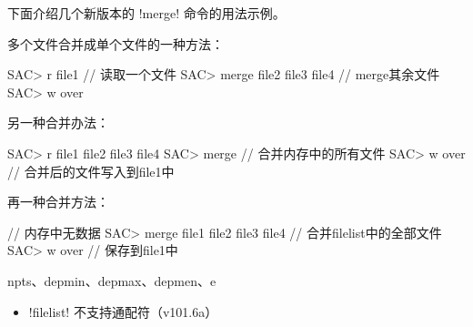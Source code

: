 下面介绍几个新版本的 !merge! 命令的用法示例。

多个文件合并成单个文件的一种方法：
\begin{SACCode}
SAC> r file1                        // 读取一个文件
SAC> merge file2 file3 file4        // merge其余文件
SAC> w over
\end{SACCode}

另一种合并办法：
\begin{SACCode}
SAC> r file1 file2 file3 file4
SAC> merge                      // 合并内存中的所有文件
SAC> w over                     // 合并后的文件写入到file1中
\end{SACCode}

再一种合并方法：
\begin{SACCode}
                                    // 内存中无数据
SAC> merge file1 file2 file3 file4  // 合并filelist中的全部文件
SAC> w over                         // 保存到file1中
\end{SACCode}

npts、depmin、depmax、depmen、e

\begin{itemize}
\item !filelist! 不支持通配符（v101.6a）
\end{itemize}
